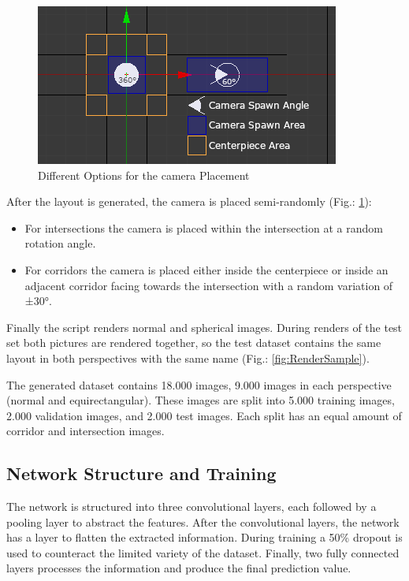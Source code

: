 \documentclass[sigconf]{acmart}
\begin{document}
\begin{figure}[h]
  \centering
  \includegraphics[width=\linewidth]{Blender_CamSpawnArea}
  \caption{Different Options for the camera Placement}
  \label{fig:Camspawn}
\end{figure}

After the layout is generated, the camera is placed semi-randomly (Fig.: \ref{fig:Camspawn}):
\begin{itemize}
\item For intersections the camera is placed within the intersection at a random rotation angle.
\item For corridors the camera is placed either inside the centerpiece or inside an adjacent corridor facing towards the intersection with a random variation of ±30°.
\end{itemize}

Finally the script renders normal and spherical images.
During renders of the test set both pictures are rendered together, so the test dataset contains the same layout in both perspectives with the same name (Fig.: \ref{fig:RenderSample}).

The generated dataset contains 18.000 images, 9.000 images in each perspective (normal and equirectangular).
These images are split into 5.000 training images, 2.000 validation images, and 2.000 test images.
Each split has an equal amount of corridor and intersection images.

\subsection{Network Structure and Training}
The network is structured into three convolutional layers, each followed by a pooling layer to abstract the features.
After the convolutional layers, the network has a layer to flatten the extracted information.
During training a 50\% dropout is used to counteract the limited variety of the dataset. Finally, two fully connected layers processes the information and produce the final prediction value.
\end{document}
